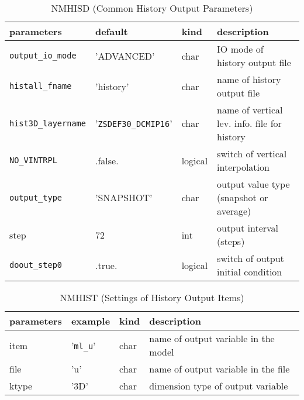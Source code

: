 \documentclass[a4paper]{article}
\begin{document}
\begin{table}[htb]
\begin{center}
\caption{NMHISD (Common History Output Parameters)}
\begin{tabularx}{150mm}{|l|l|l|X|} \hline
 \rowcolor[gray]{0.9} parameters & default & kind & description          \\ \hline
 \verb|output_io_mode|   & 'ADVANCED' & char    & IO mode of history output file \\ \hline
 \verb|histall_fname|    & 'history'  & char    & name of history output file \\ \hline
 \verb|hist3D_layername| & '\verb|ZSDEF30_DCMIP16|' & char & name of vertical lev. info. file for history \\ \hline
 \verb|NO_VINTRPL|       & .false.    & logical & switch of vertical interpolation \\ \hline
 \verb|output_type|      & 'SNAPSHOT' & char    & output value type (snapshot or average) \\ \hline
 step             & 72         & int     & output interval (steps) \\ \hline
 \verb|doout_step0|      & .true.     & logical & switch of output initial condition \\ \hline
\end{tabularx}
\end{center}
\end{table}

\begin{table}[t]
\begin{center}
\caption{NMHIST (Settings of History Output Items)}
\begin{tabularx}{150mm}{|l|l|l|X|} \hline
 \rowcolor[gray]{0.9} parameters & example & kind & description          \\ \hline
 item  & '\verb|ml_u|' & char & name of output variable in the model \\ \hline
 file  & 'u'    & char & name of output variable in the file \\ \hline
 ktype & '3D'   & char & dimension type of output variable \\ \hline
\end{tabularx}
\end{center}
\end{table}


\end{document}
